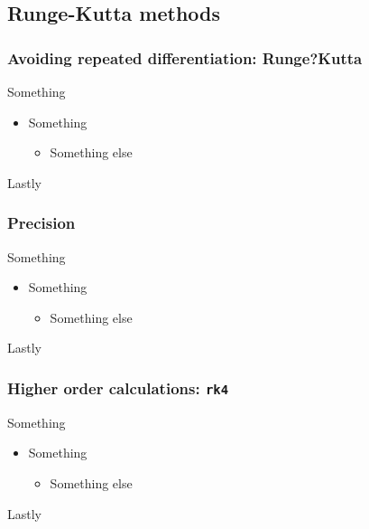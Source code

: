 \documentclass[hyperref={colorlinks=true}]{beamer}
\begin{document}
\subsection[Runge-Kutta methods]{Runge-Kutta methods}

\begin{frame}%
  \frametitle{Avoiding repeated differentiation: Runge?Kutta}

  Something
  
  \vspace{0.3cm}
  
  \begin{itemize}
    \item Something
    \begin{itemize}
      \item Something else 
    \end{itemize}
  \end{itemize}
  
  Lastly

\end{frame}


\begin{frame}%
  \frametitle{Precision}

  Something
  
  \vspace{0.3cm}
  
  \begin{itemize}
    \item Something
    \begin{itemize}
      \item Something else 
    \end{itemize}
  \end{itemize}
  
  Lastly

\end{frame}


\begin{frame}%
  \frametitle{Higher order calculations: \texttt{rk4}}

  Something
  
  \vspace{0.3cm}
  
  \begin{itemize}
    \item Something
    \begin{itemize}
      \item Something else 
    \end{itemize}
  \end{itemize}
  
  Lastly

\end{frame}
\end{document}
